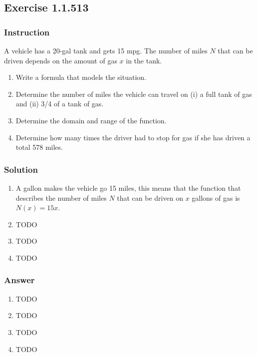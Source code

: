 \subsection*{Exercise 1.1.513}

\subsubsection*{Instruction}

A vehicle has a 20-gal tank and gets 15 mpg. The number of miles $ N $ that can be driven depends on the amount of gas $ x $ in the tank.

\begin{enumerate}[label = (\alph*)]
  \item
    Write a formula that models the situation.
  \item
    Determine the number of miles the vehicle can travel on (i) a full tank of gas and (ii) 3/4 of a tank of gas.
  \item
    Determine the domain and range of the function.
  \item
    Determine how many times the driver had to stop for gas if she has driven a total 578 miles.
\end{enumerate}

\subsubsection*{Solution}

\begin{enumerate}[label = (\alph*)]
  \item
    A gallon makes the vehicle go 15 miles, this means that the function that describes the number of miles $ N $ that can be driven on $ x $ gallons of gas is $ N(x) = 15x $.
  \item
    TODO
  \item
    TODO
  \item
    TODO
\end{enumerate}

\subsubsection*{Answer}

\begin{enumerate}[label = (\alph*)]
  \item
    TODO
  \item
    TODO
  \item
    TODO
  \item
    TODO

\end{enumerate}
